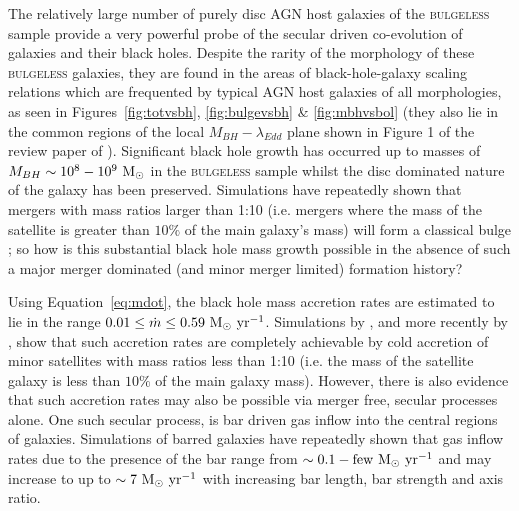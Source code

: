{The relatively large number of purely disc AGN host galaxies of the \textsc{bulgeless} sample provide a very powerful probe of the secular driven co-evolution of galaxies and their black holes. Despite the rarity of the morphology of these \textsc{bulgeless} galaxies, they are found in the areas of black-hole-galaxy scaling relations which are frequented by typical AGN host galaxies of all morphologies, as seen in Figures~\ref{fig:totvsbh}, \ref{fig:bulgevsbh} \& \ref{fig:mbhvsbol} (they also lie in the common regions of the local $M_{BH}-\lambda_{Edd}$ plane shown in Figure 1 of the review paper of \citealt{alexander12}). Significant black hole growth has occurred up to masses of $M_{BH}\sim10^8 - 10^9~\rm{M}_{\odot}$ in the \textsc{bulgeless} sample whilst the disc dominated nature of the galaxy has been preserved. Simulations have repeatedly shown that mergers with mass ratios larger than 1:10 (i.e. mergers where the mass of the satellite is greater than $10\%$ of the main galaxy's mass) will form a classical bulge \citep{walker96, hopkins11c, tonini16}; so how is this substantial black hole mass growth possible in the absence of such a major merger dominated (and minor merger limited) formation history?

Using Equation~\ref{eq:mdot}, the black hole mass accretion rates are estimated to lie in the range $0.01 \leq \dot{m} \leq 0.59 ~\rm{M}_{\odot}~\rm{yr}^{-1}$. Simulations by \citet{crockett11}, and more recently by \citet{diteodoro14}, show that such accretion rates are completely achievable by cold accretion of minor satellites with mass ratios less than 1:10 (i.e. the mass of the satellite galaxy is less than $10\%$ of the main galaxy mass). However, there is also evidence that such accretion rates may also be possible via merger free, secular processes alone. One such secular process, is bar driven gas inflow into the central regions of galaxies. Simulations of barred galaxies have repeatedly shown that gas inflow rates due to the presence of the bar range from $\sim0.1-\rm{few} ~\rm{M}_{\odot}~\rm{yr}^{-1}$ \citep{sakamoto96, maciejewski02, regan04, lin13} and may increase to up to $\sim 7 ~\rm{M}_{\odot}~\rm{yr}^{-1}$ \citep{friedli93} with increasing bar length, bar strength and axis ratio. 

}
